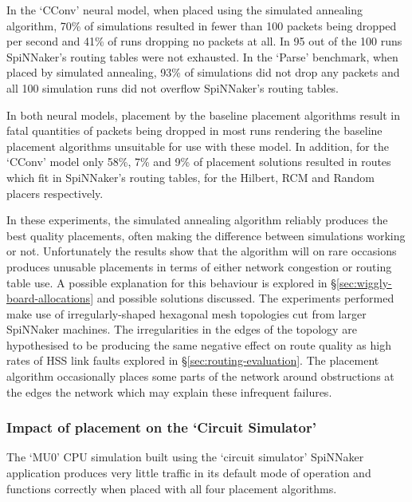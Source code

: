 				In the `CConv' neural model, when placed using the simulated annealing
				algorithm, 70\% of simulations resulted in fewer than 100 packets being
				dropped per second and 41\% of runs dropping no packets at all.  In 95
				out of the 100 runs SpiNNaker's routing tables were not exhausted. In
				the `Parse' benchmark, when placed by simulated annealing, 93\% of
				simulations did not drop any packets and all 100 simulation runs did
				not overflow SpiNNaker's routing tables.
				
				In both neural models, placement by the baseline placement algorithms
				result in fatal quantities of packets being dropped in most runs
				rendering the baseline placement algorithms unsuitable for use with
				these model. In addition, for the `CConv' model only 58\%, 7\% and 9\%
				of placement solutions resulted in routes which fit in SpiNNaker's
				routing tables, for the Hilbert, RCM and Random placers respectively.
				
				In these experiments, the simulated annealing algorithm reliably
				produces the best quality placements, often making the difference
				between simulations working or not. Unfortunately the results show that
				the algorithm will on rare occasions produces unusable placements in
				terms of either network congestion or routing table use. A possible
				explanation for this behaviour is explored in
				\S\ref{sec:wiggly-board-allocations} and possible solutions discussed.
				The experiments performed make use of irregularly-shaped hexagonal mesh
				topologies cut from larger SpiNNaker machines. The irregularities in
				the edges of the topology are hypothesised to be producing the same
				negative effect on route quality as high rates of HSS link faults
				explored in \S\ref{sec:routing-evaluation}. The placement algorithm
				occasionally places some parts of the network around obstructions at
				the edges the network which may explain these infrequent failures.
				
			\subsubsection{Impact of placement on the `Circuit Simulator'}
				
				The `MU0' CPU simulation built using the `circuit simulator' SpiNNaker
				application produces very little traffic in its default mode of
				operation and functions correctly when placed with all four placement
				algorithms.
				
